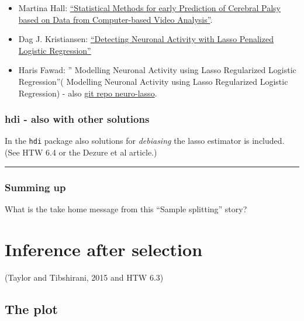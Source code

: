 \documentclass[
  letterpaper,
  DIV=11,
  numbers=noendperiod]{scrartcl}
\providecommand{\tightlist}{%
  \setlength{\itemsep}{0pt}\setlength{\parskip}{0pt}}\usepackage{longtable,booktabs,array}
\begin{document}
\begin{itemize}
\tightlist
\item
  Martina Hall: \href{http://hdl.handle.net/11250/2453095}{``Statistical
  Methods for early Prediction of Cerebral Palsy based on Data from
  Computer-based Video Analysis''}.
\item
  Dag J. Kristiansen:
  \href{http://hdl.handle.net/11250/2624609}{``Detecting Neuronal
  Activity with Lasso Penalized Logistic Regression''}
\item
  Haris Fawad: '' Modelling Neuronal Activity using Lasso Regularized
  Logistic Regression''( Modelling Neuronal Activity using Lasso
  Regularized Logistic Regression) - also
  \href{https://github.com/harisf/neuro-lasso}{git repo neuro-lasso}.
\end{itemize}

\hypertarget{hdi---also-with-other-solutions}{%
\subsubsection{hdi - also with other
solutions}\label{hdi---also-with-other-solutions}}

In the \texttt{hdi} package also solutions for \emph{debiasing} the
lasso estimator is included. (See HTW 6.4 or the Dezure et al article.)

\begin{center}\rule{0.5\linewidth}{0.5pt}\end{center}

\hypertarget{summing-up}{%
\subsubsection{Summing up}\label{summing-up}}

What is the take home message from this ``Sample splitting'' story?

\hypertarget{inference-after-selection}{%
\section{Inference after selection}\label{inference-after-selection}}

(Taylor and Tibshirani, 2015 and HTW 6.3)

\hypertarget{the-plot}{%
\subsection{The plot}\label{the-plot}}
\end{document}
